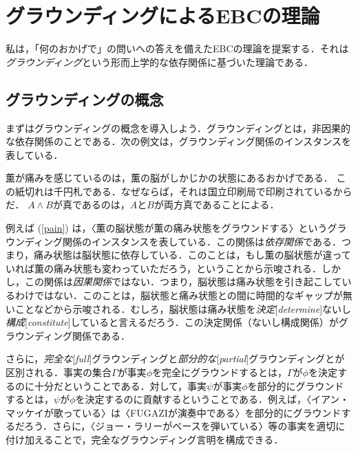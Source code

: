 \documentclass[dvipdfmx,twoside,11pt,uplatex]{jsarticle}
\newcommand{\myterm}[2]{{\emph{#1}}{[\emph{#2}]}}
\theoremstyle{definition}
\begin{document}
\section{グラウンディングによるEBCの理論}\label{ebcbyground}
私は，「何のおかげで」の問いへの答えを備えたEBCの理論を提案する．それは\emph{グラウンディング}という形而上学的な依存関係に基づいた理論である．

\subsection{グラウンディングの概念}
まずはグラウンディングの概念を導入しよう．グラウンディングとは，非因果的な依存関係のことである\citep[see][]{fine2001realism,schaffer2009grounds,rosen2010dependence}．次の例文は，グラウンディング関係のインスタンスを表している．
\begin{exe}
    \ex
        \begin{xlist}
            \ex 薫が痛みを感じているのは，薫の脳がしかじかの状態にあるおかげである．\label{pain}
            \ex この紙切れは千円札である．なぜならば，それは国立印刷局で印刷されているからだ．
            \ex $A\land B$が真であるのは，$A$と$B$が両方真であることによる．
        \end{xlist}
\end{exe}
例えば (\ref{pain}) は，〈薫の脳状態が薫の痛み状態をグラウンドする〉というグラウンディング関係のインスタンスを表している．この関係は\emph{依存関係}である．つまり，痛み状態は脳状態に依存している．このことは，もし薫の脳状態が違っていれば薫の痛み状態も変わっていただろう，ということから示唆される．しかし，この関係は\emph{因果関係}ではない．つまり，脳状態は痛み状態を引き起こしているわけではない．このことは，脳状態と痛み状態との間に時間的なギャップが無いことなどから示唆される．むしろ，脳状態は痛み状態を\myterm{決定}{determine}ないし\myterm{構成}{constitute}していると言えるだろう．この決定関係（ないし構成関係）がグラウンディング関係である．

さらに，\myterm{完全な}{full}グラウンディングと\myterm{部分的な}{partial}グラウンディングとが区別される\citep{fine2012guide}．事実の集合$\Gamma$が事実$\phi$を完全にグラウンドするとは，$\Gamma$が$\phi$を決定するのに十分だということである．対して，事実$\psi$が事実$\phi$を部分的にグラウンドするとは，$\psi$が$\phi$を決定するのに貢献するということである．例えば，〈イアン・マッケイが歌っている〉は〈FUGAZIが演奏中である〉を部分的にグラウンドするだろう．さらに，〈ジョー・ラリーがベースを弾いている〉等の事実を適切に付け加えることで，完全なグラウンディング言明を構成できる．
\end{document}
